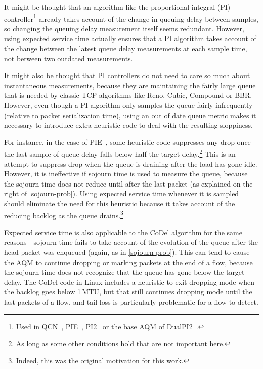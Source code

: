 It might be thought that an algorithm like the proportional integral (PI) controller\footnote{Used in QCN~\cite{IEEE802.1Qau:Ethernet_QCN}, PIE~\cite{Pan17:PIE}, PI2~\cite{DeSchepper16a:PI2} or the base AQM of DualPI2~\cite{Briscoe15e:DualQ-Coupled-AQM_ID}.} already takes account of the change in queuing delay between samples, so changing the queuing delay measurement itself seems redundant. However, using expected service time actually ensures that a PI algorithm takes account of the change between the latest queue delay measurements at each sample time, not between two outdated measurements.

It might also be thought that PI controllers do not need to care so much about instantaneous measurements, because they are maintaining the fairly large queue that is needed by classic TCP algorithms like Reno, Cubic, Compound or BBR. However, even though a PI algorithm only samples the queue fairly infrequently (relative to packet serialization time), using an out of date queue metric makes it necessary to introduce extra heuristic code to deal with the resulting sloppiness.

For instance, in the case of PIE~\cite{Pan17:PIE}, some heuristic code suppresses any drop once the last sample of queue delay falls below half the target delay.\footnote{As long as some other conditions hold that are not important here.} This is an attempt to suppress drop when the queue is draining after the load has gone idle. However, it is ineffective if sojourn time is used to measure the queue, because the sojourn time does not reduce until after the last packet (as explained on the right of \autoref{sojourn-prob}). Using expected service time whenever it is sampled should eliminate the need for this heuristic because it takes account of the reducing backlog as the queue drains.\footnote{Indeed, this was the original motivation for this work.}

Expected service time is also applicable to the CoDel algorithm for the same reasons---sojourn time fails to take account of the evolution of the queue after the head packet was enqueued (again, as in \autoref{sojourn-prob}). This can tend to cause the AQM to continue dropping or marking packets at the end of a flow, because the sojourn time does not recognize that the queue has gone below the target delay. The CoDel code in Linux includes a heuristic to exit dropping mode when the backlog goes below 1\,MTU, but that still continues dropping mode until the last packets of a flow, and tail loss is particularly problematic for a flow to detect.

